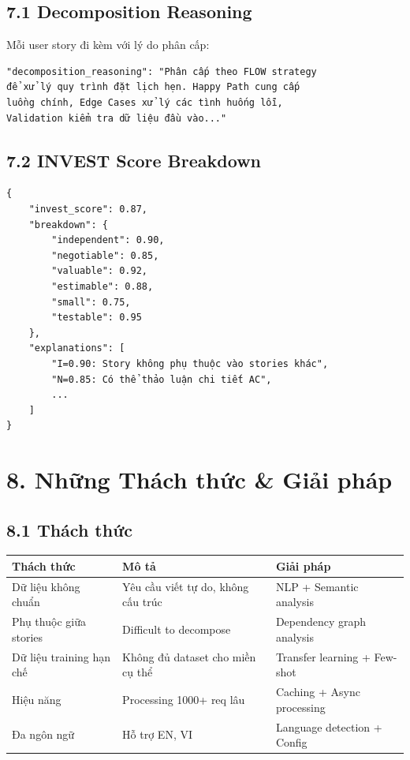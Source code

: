 \documentclass[12pt,a4paper]{article}
\begin{document}
\subsection{7.1 Decomposition Reasoning}
Mỗi user story đi kèm với lý do phân cấp:

\begin{verbatim}
"decomposition_reasoning": "Phân cấp theo FLOW strategy 
để xử lý quy trình đặt lịch hẹn. Happy Path cung cấp 
luồng chính, Edge Cases xử lý các tình huống lỗi, 
Validation kiểm tra dữ liệu đầu vào..."
\end{verbatim}

\subsection{7.2 INVEST Score Breakdown}
\begin{verbatim}
{
    "invest_score": 0.87,
    "breakdown": {
        "independent": 0.90,
        "negotiable": 0.85,
        "valuable": 0.92,
        "estimable": 0.88,
        "small": 0.75,
        "testable": 0.95
    },
    "explanations": [
        "I=0.90: Story không phụ thuộc vào stories khác",
        "N=0.85: Có thể thảo luận chi tiết AC",
        ...
    ]
}
\end{verbatim}

\section{8. Những Thách thức \& Giải pháp}

\subsection{8.1 Thách thức}

\begin{table}[h]
\centering
\begin{tabular}{|p{3cm}|p{4cm}|p{3cm}|}
\hline
\textbf{Thách thức} & \textbf{Mô tả} & \textbf{Giải pháp} \\
\hline
Dữ liệu không chuẩn & Yêu cầu viết tự do, không cấu trúc & NLP + Semantic analysis \\
\hline
Phụ thuộc giữa stories & Difficult to decompose & Dependency graph analysis \\
\hline
Dữ liệu training hạn chế & Không đủ dataset cho miền cụ thể & Transfer learning + Few-shot \\
\hline
Hiệu năng & Processing 1000+ req lâu & Caching + Async processing \\
\hline
Đa ngôn ngữ & Hỗ trợ EN, VI & Language detection + Config \\
\hline
\end{tabular}
\end{table}
\end{document}
